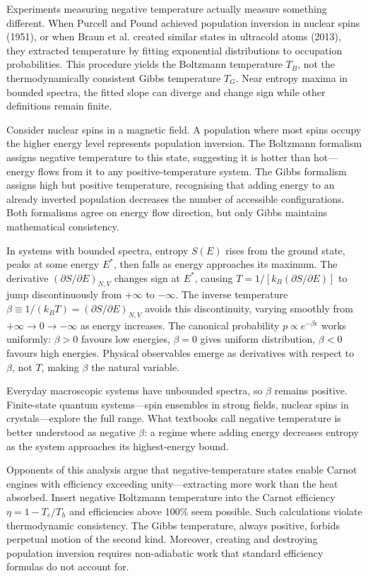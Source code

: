 Experiments measuring \QSOpen{}negative temperature\QSClose{} actually measure something different. When Purcell and Pound achieved population inversion in nuclear spins (1951), or when Braun et al. created similar states in ultracold atoms (2013), they extracted temperature by fitting exponential distributions to occupation probabilities. This procedure yields the Boltzmann temperature $T_B$, not the thermodynamically consistent Gibbs temperature $T_G$. Near entropy maxima in bounded spectra, the fitted slope can diverge and change sign while other definitions remain finite.

Consider nuclear spins in a magnetic field. A population where most spins occupy the higher energy level represents population inversion. The Boltzmann formalism assigns negative temperature to this state, suggesting it is \QSOpen{}hotter than hot\QSClose{}—energy flows from it to any positive-temperature system. The Gibbs formalism assigns high but positive temperature, recognising that adding energy to an already inverted population decreases the number of accessible configurations. Both formalisms agree on energy flow direction, but only Gibbs maintains mathematical consistency.

In systems with bounded spectra, entropy $S(E)$ rises from the ground state, peaks at some energy $E^\ast$, then falls as energy approaches its maximum. The derivative $\left(\partial S/\partial E\right)_{N,V}$ changes sign at $E^\ast$, causing $T = 1/[k_B(\partial S/\partial E)]$ to jump discontinuously from $+\infty$ to $-\infty$. The inverse temperature $\beta \equiv 1/(k_B T) = \left(\partial S/\partial E\right)_{N,V}$ avoids this discontinuity, varying smoothly from $+\infty \to 0 \to -\infty$ as energy increases. The canonical probability $p \propto e^{-\beta \epsilon}$ works uniformly: $\beta > 0$ favours low energies, $\beta = 0$ gives uniform distribution, $\beta < 0$ favours high energies. Physical observables emerge as derivatives with respect to $\beta$, not $T$, making $\beta$ the natural variable.

Everyday macroscopic systems have unbounded spectra, so $\beta$ remains positive. Finite-state quantum systems—spin ensembles in strong fields, nuclear spins in crystals—explore the full range. What textbooks call \QSOpen{}negative temperature\QSClose{} is better understood as negative $\beta$: a regime where adding energy decreases entropy as the system approaches its highest-energy bound.

Opponents of this analysis argue that negative-temperature states enable Carnot engines with efficiency exceeding unity—extracting more work than the heat absorbed. Insert negative Boltzmann temperature into the Carnot efficiency $\eta = 1 - T_c/T_h$ and efficiencies above 100\% seem possible. Such calculations violate thermodynamic consistency. The Gibbs temperature, always positive, forbids perpetual motion of the second kind. Moreover, creating and destroying population inversion requires non-adiabatic work that standard efficiency formulas do not account for.

